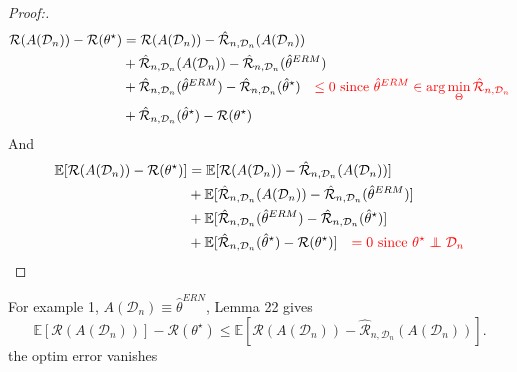 \begin{proof}[Proof:]
    \begin{align*}
        \mathcal{R}(A(\mathcal{D}_n)) - \mathcal{R}(\theta ^\star ) &= \mathcal{R}(A(\mathcal{D}_n)) - \hat{\mathcal{R}} _{n, \mathcal{D}_n} (A (\mathcal{D}_n )) \\
        &+ \hat{\mathcal{R}} _{n, \mathcal{D}_n} (A (\mathcal{D}_n )) - \hat{\mathcal{R}} _{n, \mathcal{D}_n} (\hat{\theta }^{ERM}) \\
        &+ \hat{\mathcal{R}} _{n, \mathcal{D}_n} (\hat{\theta }^{ERM}) - \hat{\mathcal{R}} _{n, \mathcal{D}_n} (\hat{\theta }^{\star }) \quad \textcolor{red}{\leq 0 \text{ since } \hat{\theta }^{ERM} \in \arg \min _{\Theta } \hat{\mathcal{R}} _{n, \mathcal{D}_n}}\\
        &+ \hat{\mathcal{R}} _{n, \mathcal{D}_n} (\hat{\theta }^{\star }) - \mathcal{R}(\theta ^\star ) \\
    \end{align*}
    And 
    \begin{align*}
        \mathbb{E}[\mathcal{R}(A(\mathcal{D}_n)) - \mathcal{R}(\theta ^\star )] &= \mathbb{E}[\mathcal{R}(A(\mathcal{D}_n)) - \hat{\mathcal{R}} _{n, \mathcal{D}_n} (A (\mathcal{D}_n )) ] \\
        &+ \mathbb{E}[\hat{\mathcal{R}} _{n, \mathcal{D}_n} (A (\mathcal{D}_n )) - \hat{\mathcal{R}} _{n, \mathcal{D}_n} (\hat{\theta }^{ERM}) ] \\
        &+ \mathbb{E}[\hat{\mathcal{R}} _{n, \mathcal{D}_n} (\hat{\theta }^{ERM}) - \hat{\mathcal{R}} _{n, \mathcal{D}_n} (\hat{\theta }^{\star }) ] \\
        &+ \mathbb{E}[\hat{\mathcal{R}} _{n, \mathcal{D}_n} (\hat{\theta }^{\star }) - \mathcal{R}(\theta ^\star )] \quad \textcolor{red}{=0 \text{ since } \theta ^\star \perp\!\!\!\!\perp \mathcal{D}_n} \\
    \end{align*}
\end{proof}

\begin{note}[]
    For example 1, $ A(\mathcal{D}_n) \equiv \hat{\theta }^{ERN} $, Lemma 22 gives 
    \[
        \mathbb{E}[ \mathcal{R} (A (\mathcal{D}_n))] - \mathcal{R} (\theta ^\star ) \leq  \mathbb{E}[ \mathcal{R}(A(\mathcal{D}_n)) - \hat{\mathcal{R} } _{n, \mathcal{D}_n} ( A(\mathcal{D}_n)) ]
    .\]
    the optim error vanishes
\end{note}


